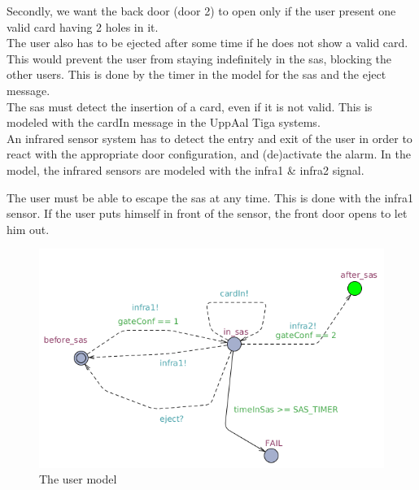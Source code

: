 Secondly, we want the back door (door 2) to open only if the user present one valid card having 2 holes in it. \\

The user also has to be ejected after some time if he does not show a valid card. This would prevent the user from staying indefinitely in the sas, blocking the other users. This is done by the timer in the model for the sas and the eject message. \\

The sas must detect the insertion of a card, even if it is not valid. This is modeled with the cardIn message in the UppAal Tiga systems.\\

An infrared sensor system has to detect the entry and exit of the user in order to react with the appropriate door configuration, and (de)activate the alarm. In the model, the infrared sensors are modeled with the infra1 \& infra2 signal.

The user must be able to escape the sas at any time. This is done with the infra1 sensor. If the user puts himself in front of the sensor, the front door opens to let him out.


\begin{figure}[!h]
	\centering
    \includegraphics[width=\textwidth]{User_model.png}
    \caption{The user model}
    \label{userModel}
\end{figure}

